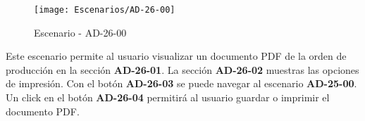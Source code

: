 \begin{figure}[H]
\centering
\texttt{[image: Escenarios/AD-26-00]}
\caption{Escenario - AD-26-00}
\label{fig:AD-26-00}
\end{figure}

Este escenario permite al usuario visualizar un documento PDF de la orden de producción en la sección \textbf{AD-26-01}. La sección \textbf{AD-26-02} muestras las opciones de impresión. Con el botón \textbf{AD-26-03} se puede navegar al escenario \textbf{AD-25-00}. Un click en el botón \textbf{AD-26-04} permitirá al usuario guardar o imprimir el documento PDF.
\\